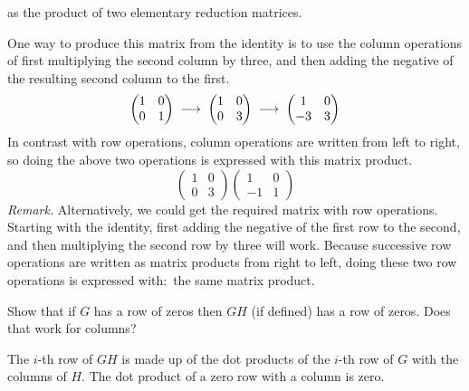 \begin{exercises}
    as the product of two elementary reduction matrices.
    \begin{answer}
      One way to produce this matrix from the identity is to use 
      the column operations
      of first multiplying the second column by three, and then adding the 
      negative of the resulting second column to the first.
      \begin{equation*}
        \begin{pmatrix}
          1  &0  \\
          0  &1
        \end{pmatrix}
        \;\mathrel{ \mathop{\longrightarrow}\limits^{\mathstrut}_{ \begin{subarray}{l} \relax \end{subarray}}}\;
        \begin{pmatrix}
          1  &0  \\
          0  &3
        \end{pmatrix}
        \;\mathrel{ \mathop{\longrightarrow}\limits^{\mathstrut}_{ \begin{subarray}{l} \relax \end{subarray}}}\;
        \begin{pmatrix}
          1  &0  \\
          -3  &3
        \end{pmatrix}
      \end{equation*}
      In contrast with row operations, column operations are written from
      left to right, so doing the above two operations
      is expressed with this matrix product.
      \begin{equation*}
        \begin{pmatrix}
          1  &0  \\
          0  &3
        \end{pmatrix}
        \begin{pmatrix}
          1  &0  \\
         -1  &1
        \end{pmatrix}
      \end{equation*}
      \textit{Remark.}
      Alternatively, we could get the required matrix with row operations.
      Starting with the identity, first adding the negative of the first 
      row to the  second, and then multiplying the second row by three
      will work.
      Because successive row operations are written as matrix products from
      right to left, doing these two row operations is expressed with:~the 
      same matrix product.    
    \end{answer}
  \recommended \item 
    Show that if \( G \) has a row of zeros then \( GH \)
    (if defined) has a row of zeros.
    Does that work for columns?
    \begin{answer}
      The \( i \)-th row of \( GH \) is made up of the dot products of
      the \( i \)-th row of \( G \) with the columns of \( H \).
      The dot product of a zero row with a column is zero.


\end{answer}
\end{exercises}

